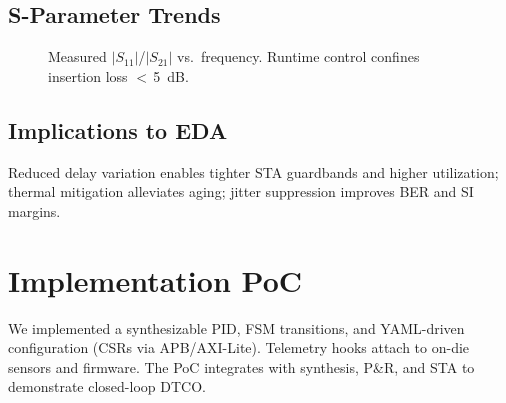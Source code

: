 \documentclass[conference]{IEEEtran}
\begin{document}
\subsection{S-Parameter Trends}
\begin{figure}[t]
\centering
{}
\caption{Measured $|S_{11}|$/$|S_{21}|$ vs.\ frequency. Runtime control confines insertion loss $<\,$\SI{5}{dB}.}
\label{fig:sparam}
\end{figure}

\subsection{Implications to EDA}
Reduced delay variation enables tighter STA guardbands and higher utilization; thermal mitigation alleviates aging; jitter suppression improves BER and SI margins.

\section{Implementation PoC}
We implemented a synthesizable PID, FSM transitions, and YAML-driven configuration (CSRs via APB/AXI-Lite). Telemetry hooks attach to on-die sensors and firmware. The PoC integrates with synthesis, P\&R, and STA to demonstrate closed-loop DTCO.
\end{document}
